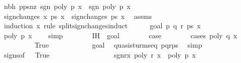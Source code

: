 \begin{isabellebody}
\ nbh{\isacharcolon}\ {\isachardoublequoteopen}{\isasymforall}p{\isasymin}{\isacharquery}ps{\isacharunderscore}nz{\isachardot}\ sgn\ {\isacharparenleft}poly\ p\ x{\isacharparenright}\ {\isacharequal}\ sgn\ {\isacharparenleft}poly\ p\ x\isanewline
\ \ \ \ \isamarkupfalse%
\ {\isachardoublequoteopen}sign{\isacharunderscore}changes{\isacharprime}\ x\ ps\ x\ {\isacharequal}\ sign{\isacharunderscore}changes\ ps\ x{\isachardoublequoteclose}\ \isamarkupfalse%
\ assms{\isacharparenleft}{}{\isacharparenright}\isanewline
\ \ \ \ \isamarkupfalse%
\ {\isacharparenleft}induction\ x\ rule{\isacharcolon}\ split{\isacharunderscore}sign{\isacharunderscore}changes{\isacharunderscore}induct{\isacharparenright}\isanewline
\ \ \ \ \isamarkupfalse%
\ {\isacharparenleft}goal{}\ p\ q\ r\ ps\ x\isanewline
\ \ \ \ \ \ \isamarkupfalse%
\ {\isachardoublequoteopen}poly\ p\ x\ {\isasymnoteq}\ {}{\isachardoublequoteclose}\ \isamarkupfalse%
\ simp\isanewline
\ \ \ \ \ \ \isamarkupfalse%
\ IH\ {\isacharequal}\ goal{}{\isacharparenleft}{}{\isacharcomma}{}{\isacharcomma}{}{\isacharparenright}\isanewline
\ \ \ \ \ \ \isamarkupfalse%
\ {\isacharquery}case\isanewline
\ \ \ \ \ \ \isamarkupfalse%
\ {\isacharparenleft}cases\ {\isachardoublequoteopen}poly\ q\ x\ {\isacharequal}\ {}{\isachardoublequoteclose}{\isacharparenright}\isanewline
\ \ \ \ \ \ \ \ \isamarkupfalse%
\ True\isanewline
\ \ \ \ \ \ \ \ \ \ \isamarkupfalse%
\ goal{}\ \isamarkupfalse%
\ quasi{\isacharunderscore}sturm{\isacharunderscore}seq\ {\isachardoublequoteopen}p{\isacharhash}q{\isacharhash}r{\isacharhash}ps{\isachardoublequoteclose}\ \isamarkupfalse%
\ simp\isanewline
\ \ \ \ \ \ \ \ \ \ \isamarkupfalse%
\ signs{\isacharbrackleft}of\ {}{\isacharbrackright}\ \ True\ \isamarkupfalse%
\ \isanewline
\ \ \ \ \ \ \ \ \ \ \ \ \ \ \ sgn{\isacharunderscore}r{\isacharunderscore}x{}{\isacharcolon}\ {\isachardoublequoteopen}poly\ r\ x\ {\isacharasterisk}\ poly\ p\ x\ {\isacharless}\ {}{\isachardoublequoteclose}\ \isamarkupfalse%

\end{isabellebody}
